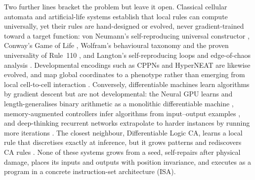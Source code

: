 Two further lines bracket the problem but leave it open. Classical cellular automata and artificial-life systems establish that local rules can compute universally, yet their rules are hand-designed or evolved, never gradient-trained toward a target function: von Neumann's self-reproducing universal constructor \citep{vonneumann1966automata}, Conway's Game of Life \citep{gardner1970life}, Wolfram's behavioural taxonomy \citep{wolfram2002nks} and the proven universality of Rule~110 \citep{cook2004rule110}, and Langton's self-reproducing loops \citep{langton1984selfreproduction} and edge-of-chaos analysis \citep{langton1990edgeofchaos}. Developmental encodings such as CPPNs and HyperNEAT are likewise evolved, and map global coordinates to a phenotype rather than emerging from local cell-to-cell interaction \citep{stanley2007cppn,stanley2009hyperneat}. Conversely, differentiable machines learn algorithms by gradient descent but are not developmental: the Neural GPU learns and length-generalises binary arithmetic as a monolithic differentiable machine \citep{kaiser2016neuralgpu}, memory-augmented controllers infer algorithms from input--output examples \citep{graves2014ntm,graves2016dnc}, and deep-thinking recurrent networks extrapolate to harder instances by running more iterations \citep{schwarzschild2021easytohard}. The closest neighbour, Differentiable Logic CA, learns a local rule that discretises exactly at inference, but it grows patterns and rediscovers CA rules \citep{miotti2025difflogicca}. None of these systems grows from a seed, self-repairs after physical damage, places its inputs and outputs with position invariance, and executes as a program in a concrete instruction-set architecture (ISA).

